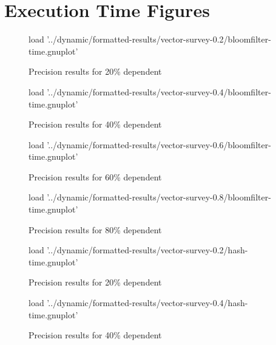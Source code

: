 \chapter{Execution Time Figures} \label{chp:appndx:time-figs}
\begin{figure}[H]
	\centering
	\begin{gnuplot}[terminal=pdf]
	load '../dynamic/formatted-results/vector-survey-0.2/bloomfilter-time.gnuplot'
	\end{gnuplot}
	\caption{Precision results for 20\% dependent}
	\label{chart:time-0.2-bloom}
\end{figure}


\begin{figure}[H]
	\centering
	\begin{gnuplot}[terminal=pdf]
	load '../dynamic/formatted-results/vector-survey-0.4/bloomfilter-time.gnuplot'
	\end{gnuplot}
	\caption{Precision results for 40\% dependent}
	\label{chart:time-0.4-bloom}
\end{figure}

\begin{figure}[H]
	\centering
	\begin{gnuplot}[terminal=pdf]
	load '../dynamic/formatted-results/vector-survey-0.6/bloomfilter-time.gnuplot'
	\end{gnuplot}
	\caption{Precision results for 60\% dependent}
	\label{chart:time-0.6-bloom}
\end{figure}

\begin{figure}[H]
	\centering
	\begin{gnuplot}[terminal=pdf]
	load '../dynamic/formatted-results/vector-survey-0.8/bloomfilter-time.gnuplot'
	\end{gnuplot}
	\caption{Precision results for 80\% dependent}
	\label{chart:time-0.8-bloom}
\end{figure}

\begin{figure}[H]
	\centering
	\begin{gnuplot}[terminal=pdf]
	load '../dynamic/formatted-results/vector-survey-0.2/hash-time.gnuplot'
	\end{gnuplot}
	\caption{Precision results for 20\% dependent}
	\label{chart:time-0.2-hash}
\end{figure}


\begin{figure}[H]
	\centering
	\begin{gnuplot}[terminal=pdf]
	load '../dynamic/formatted-results/vector-survey-0.4/hash-time.gnuplot'
	\end{gnuplot}
	\caption{Precision results for 40\% dependent}
	\label{chart:time-0.4-hash}
\end{figure}

